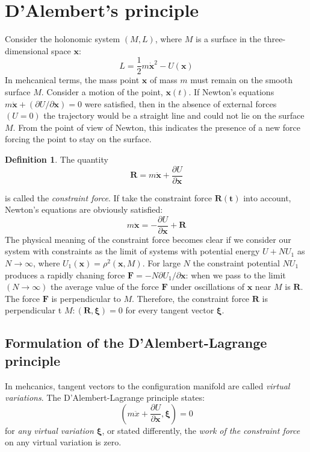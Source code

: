 \documentclass[conference]{IEEEtran}
\theoremstyle{definition}
\newtheorem{definition}{Definition}[section]
\theoremstyle{remark}
\begin{document}
    \section{D'Alembert's principle}
    Consider the holonomic system $(M, L)$, where $M$ is a surface in the three-dimensional space ${\mathbf{x}}$:
    \begin{equation*}
        L = \dfrac12m\dot{\mathbf{x}}^2 - U(\mathbf{x})
    \end{equation*}
    In mehcanical terms, the mass point $\mathbf{x}$ of mass $m$ must remain on the smooth surface $M$. Consider a motion of the point, $\mathbf{x}(t)$. If Newton's equations $m \ddot{\mathbf{x}} + (\partial U / \partial \mathbf{x}) = 0$ were satisfied, then in the absence of external forces $(U = 0)$ the trajectory would be a straight line and could not lie on the surface $M$. From the point of view of Newton, this indicates the presence of a new force forcing the point to stay on the surface.
    \begin{definition}
        The quantity
        \begin{equation*}
            \mathbf{R} = m \ddot{\mathbf{x}} + \dfrac{\partial U}{\partial \mathbf{x}}
        \end{equation*}
    \end{definition}
    is called the \emph{constraint force}. If take the constraint force $\mathbf{R(t)}$ into account, Newton's equations are obviously satisfied:
    \begin{equation*}
        m \ddot{\mathbf{x}} = -\dfrac{\partial U}{\partial \mathbf{x}} + \mathbf{R}
    \end{equation*}
    The physical meaning of the constraint force becomes clear if we consider our system with constraints as the limit of systems with potential energy $U + NU_1$ as $N \to \infty$, where $U_1(\mathbf{x}) = \rho^2 (\mathbf{x}, M)$. For large $N$ the constraint potential $NU_1$ produces a rapidly chaning force $\mathbf{F} = -N \partial U_1 / \partial \mathbf{x}$: when we pass to the limit $(N \to \infty)$ the average value of the force $\mathbf{F}$ under oscillations of $\mathbf{x}$ near $M$ is $\mathbf{R}$. The force $\mathbf{F}$ is perpendicular to $M$. Therefore, the constraint force $\mathbf{R}$ is perpendicular t $M: (\mathbf{R}, \bm{\xi}) = 0$ for every tangent vector $\bm{\xi}$.

    \subsection{Formulation of the D'Alembert-Lagrange principle}
    In mehcanics, tangent vectors to the configuration manifold are called \emph{virtual variations}. The D'Alembert-Lagrange principle states:
    \begin{equation*}
        \left( m \ddot{x} + \dfrac{\partial U}{\partial \mathbf{x}}, \bm{\xi} \right) = 0
    \end{equation*}
    for \emph{any virtual variation $\bm{\xi}$}, or stated differently, the \emph{work of the constraint force} on any virtual variation is zero.
\end{document}
